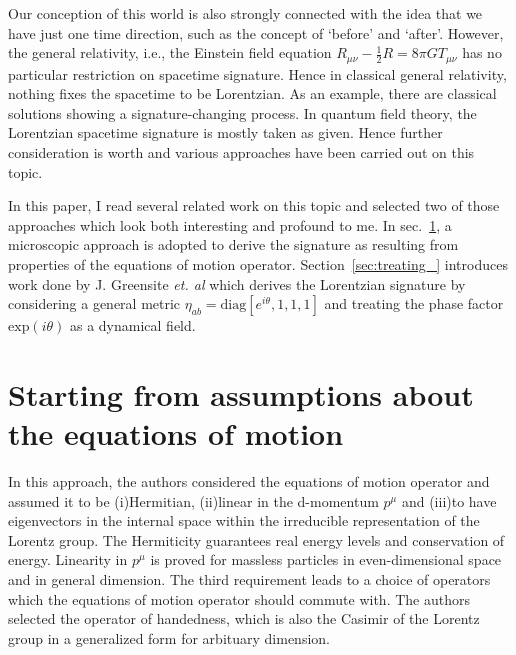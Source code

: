 \documentclass[%
 reprint,
groupedaddress,
showpacs,
 amsmath,amssymb,
 aps,
prb,
]{revtex4-1}
\begin{document}
Our conception of this world is also strongly connected with the idea that we have just one time direction, such as the concept of `before' and `after'. However, the general relativity, i.e., the Einstein field equation $ R_{\mu\nu}-\frac{1}{2}R = 8 \pi G T_{\mu \nu} $ has no particular restriction on spacetime signature. Hence in classical general relativity, nothing fixes the spacetime to be Lorentzian. As an example, there are classical solutions showing a signature-changing process.\cite{0264-9381-9-6-011} In quantum field theory, the Lorentzian spacetime signature is mostly taken as given. Hence further consideration is worth and various approaches have been carried out on this topic.

In this paper, I read several related work on this topic and selected two of those approaches which look both interesting and profound to me. In sec.~\ref{sec:starting_from_assumptions_about_the_equations_of_motion}, a microscopic approach is adopted to derive the signature as resulting from properties of the equations of motion operator.\cite{MankocBorstnik2000314,0305-4470-35-49-306} Section~\ref{sec:treating_} introduces work done by J. Greensite \textit{et. al}\cite{Greensite199334,PhysRevD.49.866} which derives the Lorentzian signature by considering a general metric $ \eta_{ab} = \mathrm{diag}[e^{i \theta},1,1,1] $ and treating the phase factor $ \mathrm{exp}(i \theta) $ as a dynamical field.


\section{Starting from assumptions about the equations of motion} %
\label{sec:starting_from_assumptions_about_the_equations_of_motion}

In this approach, the authors considered the equations of motion operator and assumed it to be (i)Hermitian, (ii)linear in the d-momentum $ p^{\mu} $ and (iii)to have eigenvectors in the internal space within the irreducible representation of the Lorentz group. The Hermiticity guarantees real energy levels and conservation of energy. Linearity in $ p^{\mu} $ is proved for massless particles in even-dimensional space\cite{gornik2001linear} and in general dimension.\cite{SIEGEL1987125} The third requirement leads to a choice of operators which the equations of motion operator should commute with. The authors selected the operator of handedness, which is also the Casimir of the Lorentz group in a generalized form for arbituary dimension.
\end{document}
